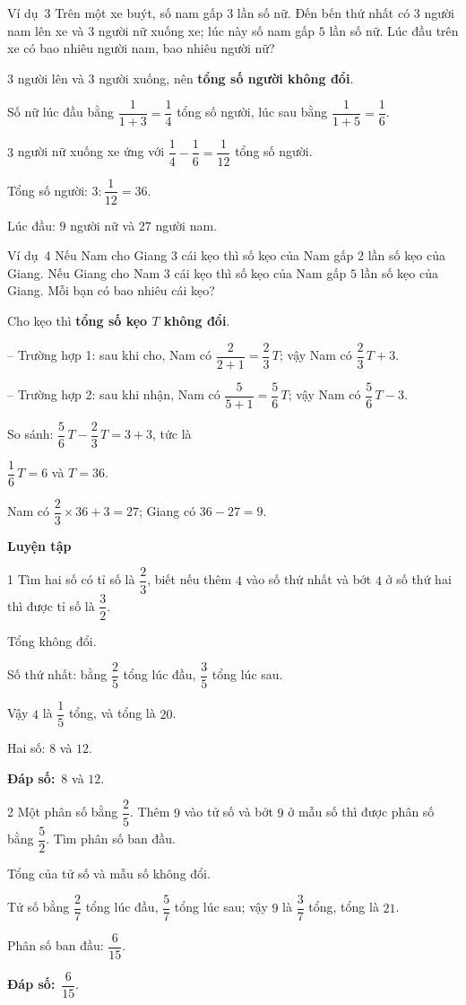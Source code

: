 \documentclass[11pt]{article}
\newif\ifsol \solfalse
\providecommand{\AnsWord}{Đáp số}
\newcommand{\dapso}[1]{\par\textbf{\AnsWord:}\ #1}
\newcommand{\guide}{\par\vspace{4pt}{\bfseries\color{tmBlue}\GuideWord}\par\vspace{3pt}\nopagebreak}
\newcommand{\probsol}[1]{%
  \begin{lrbox}{\solmeasure}\begin{minipage}{\dimexpr\linewidth-24pt\relax}#1\end{minipage}\end{lrbox}%
  \ifsol
    \begin{solbox}#1\end{solbox}%
  \else
    \setlength{\solht}{\dimexpr\ht\solmeasure+\dp\solmeasure+0.85cm\relax}%
    \ifdim\solht<1.35cm\setlength{\solht}{1.35cm}\fi
    \begin{tcolorbox}[colback=white,colframe=Line,boxrule=0.8pt,arc=5pt,
      left=8pt,right=8pt,top=4pt,bottom=4pt,height=\solht]{\footnotesize\color{Slate}\itshape\WorkWord}\end{tcolorbox}%
  \fi}
\newcommand{\dividerbar}[1]{\par\vspace{0.6em}\noindent
  \begin{tcolorbox}[enhanced,frame hidden,interior hidden,borderline west={5pt}{0pt}{ProbBlue},
    colback=white,left=12pt,right=12pt,top=5pt,bottom=5pt,arc=4pt]
  {\large\bfseries\color{ProbBlue} #1}\end{tcolorbox}\vspace{0.4em}}
\newcommand{\gap}{\vspace{0.3cm}}
\def\GuideWord{Hướng dẫn giải.}
\def\WorkWord{Bài làm:}
\def\AnsWord{Đáp số}
\def\ExWord{Ví dụ}
\begin{document}
\gap
\begin{exbox}{\ExWord\ 3}
Trên một xe buýt, số nam gấp $3$ lần số nữ. Đến bến thứ nhất có $3$ người nam lên xe và $3$ người nữ xuống xe; lúc này số nam gấp $5$ lần số nữ. Lúc đầu trên xe có bao nhiêu người nam, bao nhiêu người nữ?
\guide
$3$ người lên và $3$ người xuống, nên \textbf{tổng số người không đổi}.\par
Số nữ lúc đầu bằng $\dfrac1{1+3}=\dfrac14$ tổng số người, lúc sau bằng $\dfrac1{1+5}=\dfrac16$.\par $3$ người nữ xuống xe ứng với $\dfrac14-\dfrac16=\dfrac1{12}$ tổng số người.\par
Tổng số người: $3:\dfrac1{12}=36$.\par Lúc đầu: $9$ người nữ và $27$ người nam.
\end{exbox}
\gap
\begin{exbox}{\ExWord\ 4}
Nếu Nam cho Giang $3$ cái kẹo thì số kẹo của Nam gấp $2$ lần số kẹo của Giang. Nếu Giang cho Nam $3$ cái kẹo thì số kẹo của Nam gấp $5$ lần số kẹo của Giang. Mỗi bạn có bao nhiêu cái kẹo?
\guide
Cho kẹo thì \textbf{tổng số kẹo $T$ không đổi}.\par
-- Trường hợp 1: sau khi cho, Nam có $\dfrac2{2+1}=\dfrac23\,T$; vậy Nam có $\dfrac23\,T+3$.\par
-- Trường hợp 2: sau khi nhận, Nam có $\dfrac5{5+1}=\dfrac56\,T$; vậy Nam có $\dfrac56\,T-3$.\par
So sánh: $\dfrac56\,T-\dfrac23\,T=3+3$, tức là\par $\dfrac16\,T=6$ và $T=36$.\par
Nam có $\dfrac23\times36+3=27$; Giang có $36-27=9$.
\end{exbox}
\dividerbar{Luyện tập}
\begin{probbox}{1}{\relax}
Tìm hai số có tỉ số là $\dfrac23$, biết nếu thêm $4$ vào số thứ nhất và bớt $4$ ở số thứ hai thì được tỉ số là $\dfrac32$.
\end{probbox}
\probsol{
Tổng không đổi.\par Số thứ nhất: bằng $\dfrac25$ tổng lúc đầu, $\dfrac35$ tổng lúc sau.\par Vậy $4$ là $\dfrac15$ tổng, và tổng là $20$.\par
Hai số: $8$ và $12$.
\dapso{$8$ và $12$.}}
\gap
\begin{probbox}{2}{\relax}
Một phân số bằng $\dfrac25$. Thêm $9$ vào tử số và bớt $9$ ở mẫu số thì được phân số bằng $\dfrac52$. Tìm phân số ban đầu.
\end{probbox}
\probsol{
Tổng của tử số và mẫu số không đổi.\par Tử số bằng $\dfrac27$ tổng lúc đầu, $\dfrac57$ tổng lúc sau; vậy $9$ là $\dfrac37$ tổng, tổng là $21$.\par
Phân số ban đầu: $\dfrac6{15}$.
\dapso{$\dfrac6{15}$.}}
\end{document}
